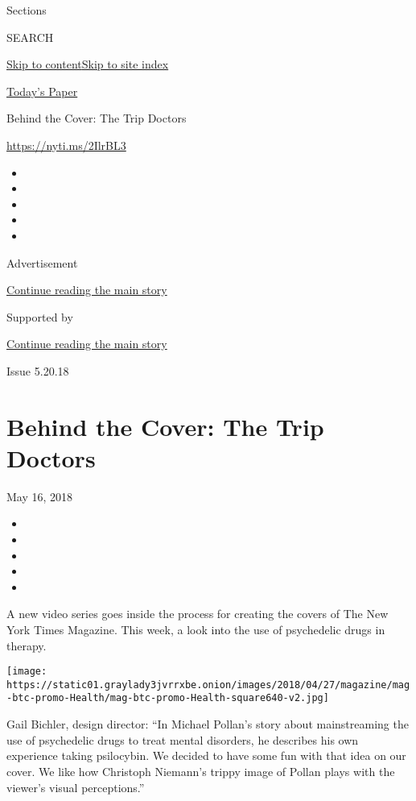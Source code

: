 Sections

SEARCH

\protect\hyperlink{site-content}{Skip to
content}\protect\hyperlink{site-index}{Skip to site index}

\href{https://myaccount.nytimes3xbfgragh.onion/auth/login?response_type=cookie\&client_id=vi}{}

\href{https://www.nytimes3xbfgragh.onion/section/todayspaper}{Today's
Paper}

Behind the Cover: The Trip Doctors

\url{https://nyti.ms/2IlrBL3}

\begin{itemize}
\item
\item
\item
\item
\item
\end{itemize}

Advertisement

\protect\hyperlink{after-top}{Continue reading the main story}

Supported by

\protect\hyperlink{after-sponsor}{Continue reading the main story}

Issue 5.20.18

\hypertarget{behind-the-cover-the-trip-doctors}{%
\section{Behind the Cover: The Trip
Doctors}\label{behind-the-cover-the-trip-doctors}}

May 16, 2018

\begin{itemize}
\item
\item
\item
\item
\item
\end{itemize}

A new video series goes inside the process for creating the covers of
The New York Times Magazine. This week, a look into the use of
psychedelic drugs in therapy.

\texttt{[image: https://static01.graylady3jvrrxbe.onion/images/2018/04/27/magazine/mag-btc-promo-Health/mag-btc-promo-Health-square640-v2.jpg]}

Gail Bichler, design director: ``In Michael Pollan's story about
mainstreaming the use of psychedelic drugs to treat mental disorders, he
describes his own experience taking psilocybin. We decided to have some
fun with that idea on our cover. We like how Christoph Niemann's trippy
image of Pollan plays with the viewer's visual perceptions.''

